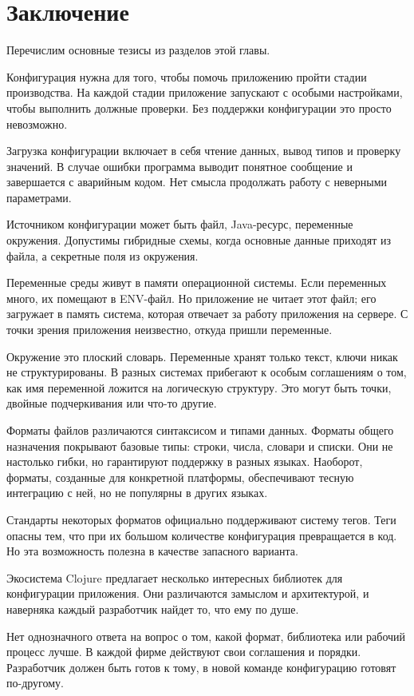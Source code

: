 \section{Заключение}

Перечислим основные тезисы из разделов этой главы.

Конфигурация нужна для того, чтобы помочь приложению пройти стадии
производства. На каждой стадии приложение запускают с особыми настройками, чтобы
выполнить должные проверки. Без поддержки конфигурации это просто невозможно.

Загрузка конфигурации включает в себя чтение данных, вывод типов и проверку
значений. В случае ошибки программа выводит понятное сообщение и завершается с
аварийным кодом. Нет смысла продолжать работу с неверными параметрами.

Источником конфигурации может быть файл, Java-ресурс, переменные
окружения. Допустимы гибридные схемы, когда основные данные приходят из файла, а
секретные поля из окружения.

Переменные среды живут в памяти операционной системы. Если переменных много, их
помещают в ENV-файл. Но приложение не читает этот файл; его загружает в память
система, которая отвечает за работу приложения на сервере. С точки зрения
приложения неизвестно, откуда пришли переменные.

Окружение это плоский словарь. Переменные хранят только текст, ключи никак не
структурированы. В разных системах прибегают к особым соглашениям о том, как имя
переменной ложится на логическую структуру. Это могут быть точки, двойные
подчеркивания или что-то другие.

Форматы файлов различаются синтаксисом и типами данных. Форматы общего
назначения покрывают базовые типы: строки, числа, словари и списки. Они не
настолько гибки, но гарантируют поддержку в разных языках. Наоборот, форматы,
созданные для конкретной платформы, обеспечивают тесную интеграцию с ней, но не
популярны в других языках.

Стандарты некоторых форматов официально поддерживают систему тегов. Теги опасны
тем, что при их большом количестве конфигурация превращается в код. Но эта
возможность полезна в качестве запасного варианта.

Экосистема Clojure предлагает несколько интересных библиотек для конфигурации
приложения. Они различаются замыслом и архитектурой, и наверняка каждый
разработчик найдет то, что ему по душе.

Нет однозначного ответа на вопрос о том, какой формат, библиотека или рабочий
процесс лучше. В каждой фирме действуют свои соглашения и порядки. Разработчик
должен быть готов к тому, в новой команде конфигурацию готовят по-другому.
